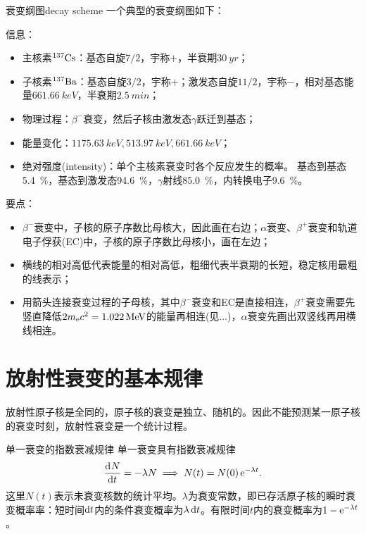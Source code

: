 \begin{definition}
	{衰变纲图}{decay scheme}
	一个典型的衰变纲图如下：
	\begin{notecaptionblock}
		\label{fig:decay scheme beta-}
	\end{notecaptionblock}
	信息：
	\begin{itemize}
		\item 主核素$\nuclide{137}{Cs}$：基态自旋$7/2$，宇称$+$，半衰期$\qty{30}{yr}$；
		\item 子核素$\nuclide{137}{Ba}$：基态自旋$3/2$，宇称$+$；激发态自旋$11/2$，宇称$-$，相对基态能量$\qty{661.66}{keV}$，半衰期$\qty{2.5}{min}$；
		\item 物理过程：$\beta^-$衰变，然后子核由激发态$\gamma$跃迁到基态；
		\item 能量变化：$\qty{1175.63}{keV},\qty{513.97}{keV},\qty{661.66}{keV}$；
		\item 绝对强度(intensity)：单个主核素衰变时各个反应发生的概率。
		基态到基态\qty{5.4}{\percent}，基态到激发态\qty{94.6}{\percent}，$\gamma$射线\qty{85.0}{\percent}，内转换电子\qty{9.6}{\percent}。
	\end{itemize}
	\tcblower
	要点：
	\begin{itemize}
		\item $\beta^-$衰变中，子核的原子序数比母核大，因此画在右边；$\alpha$衰变、$\beta^+$衰变和轨道电子俘获(EC)中，子核的原子序数比母核小，画在左边；
		\item 横线的相对高低代表能量的相对高低，粗细代表半衰期的长短，稳定核用最粗的线表示；
		\item 用箭头连接衰变过程的子母核，其中$\beta^-$衰变和EC是直接相连，$\beta^+$衰变需要先竖直降低$2m_{\mathrm{e}} c^2 = \qty{1.022}{MeV}$的能量再相连(见...)，$\alpha$衰变先画出双竖线再用横线相连。
	\end{itemize} 
\end{definition}

\section{放射性衰变的基本规律}

放射性原子核是全同的，原子核的衰变是独立、随机的。因此不能预测某一原子核的衰变时刻，放射性衰变是一个统计过程。

\begin{theorem}
	{单一衰变的指数衰减规律}{}
	单一衰变具有指数衰减规律
	\begin{equation}
		\frac{\mathop{}\!\mathrm{d}^{}N}{\mathrm{d}{t}^{}} = -\lambda N \implies N(t) = N(0)\mathop{}\!\mathrm{e}^{-\lambda t}.
	\end{equation}
	这里$N(t)$表示未衰变核数的统计平均。$\lambda$为衰变常数，即已存活原子核的瞬时衰变概率率：短时间$\mathop{}\!\mathrm{d} t$内的条件衰变概率为$\lambda\mathop{}\!\mathrm{d} t$。有限时间$t$内的衰变概率为$1 - \mathop{}\!\mathrm{e}^{-\lambda t}$。
\end{theorem}


